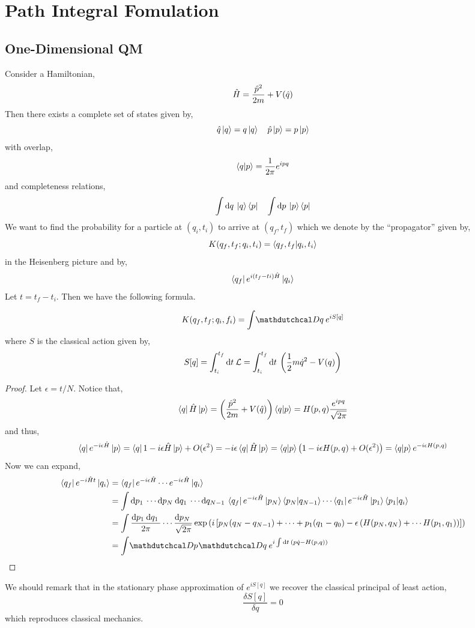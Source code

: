 \documentclass[12pt]{extarticle}
\begin{document}
\section{Path Integral Fomulation}

\subsection{One-Dimensional QM}

Consider a Hamiltonian,
\[ \hat{H} = \frac{\hat{p}^2}{2m} + V(\hat{q}) \]
Then there exists a complete set of states given by,
\[ \hat{q} \left| q \right> = q \left| q \right> \quad \hat{p} \left| p \right> = p \left| p \right> \]
with overlap,
\[ \left< q | p \right> = \frac{1}{2 \pi} e^{i p q} \]
and completeness relations,
\[ \int \mathrm{d}q \: \left| q \right> \left< p \right| \quad \int \mathrm{d}p \: \left| p \right> \left< p \right| \]
We want to find the probability for a particle at $(q_i, t_i)$ to arrive at $(q_f, t_f)$ which we denote by the ``propagator'' given by,
\[ K(q_f, t_f ; q_i, t_i) = \left< q_f, t_f | q_i, t_i \right> \]
in the Heisenberg picture and by,
\[ \left< q_f \right| e^{i (t_f - ti) \hat{H}} \left| q_i \right> \]
Let $t = t_f - t_i$. Then we have the following formula.
\begin{theorem}
\[ K(q_f, t_f ; q_i, f_i) = \int \pathd{q} e^{i S[q]} \]
where $S$ is the classical action given by,
\[ S[q] = \int_{t_i}^{t_f} \mathrm{d}t \: \mathcal{L} = \int_{t_i}^{t_f} \mathrm{d}t \: \left( \frac{1}{2} m \dot{q}^2 - V(q) \right) \]
\end{theorem}
\begin{proof}
Let $\epsilon = t / N$. Notice that,
\[ \left< q \right| \hat{H} \left| p \right> = \left( \frac{\hat{p}^2}{2m} + V(\hat{q}) \right) \left< q | p \right> = H(p, q) \frac{e^{ipq}}{\sqrt{2 \pi}} \]
and thus,
\[ \left< q \right| e^{-i \epsilon \hat{H}} \left| p \right> = \left< q \right| 1 -i \epsilon \hat{H} \left| p \right> + O(\epsilon^2) = -i \epsilon \left< q \right| \hat{H} \left| p \right> = \left< q | p \right> \left(1 - i \epsilon H(p, q) + O(\epsilon^2) \right) = \left< q | p \right> e^{- i \epsilon H(p, q)} \]
Now we can expand,
\begin{align*}
\bra{q_f} e^{- i \hamilt t} \ket{q_i} & = \bra{q_f} e^{-i \epsilon \hamilt} \cdots e^{-i \epsilon \hamilt} \ket{q_i}
\\
& = \int \d{p_1} \cdots \d{p_N} \d{q_1} \cdots \d{q_{N-1}}  \bra{q_f} e^{-i \epsilon \hamilt} \ket{p_N} \inner{p_N}{q_{N-1}}  \cdots \bra{q_1} e^{-i \epsilon \hamilt} \ket{p_1} \inner{p_1}{q_i}
\\
& = \int \frac{\d{p_1} \d{q_1}}{2 \pi} \cdots \frac{\d{p_N}}{\sqrt{2 \pi}} \exp{\left( i\left[ p_N (q_N - q_{N-1}) + \cdots + p_1 (q_1 - q_0) - \epsilon \left( H(p_N, q_N) + \cdots H(p_1, q_1) \right) \right] \right)}
\\
& = \int \pathd{p} \pathd{q} e^{i \int \d{t} \left( p \dot{q} - H(p,q) \right) }
\end{align*}
\end{proof}
We should remark that in the stationary phase approximation of $e^{i S[q]}$ we recover the classical principal of least action,
\[ \frac{\delta S[q]}{\delta q} = 0 \]
which reproduces classical mechanics. 
\end{document}
